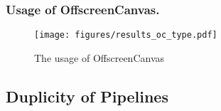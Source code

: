 
\subsubsection{Usage of OffscreenCanvas.}

\begin{figure}[tp]
\centering
\texttt{[image: figures/results\_oc\_type.pdf]}
\caption{The usage of OffscreenCanvas}\label{fig_oc_type}
\end{figure}

\subsection{Duplicity of Pipelines}


